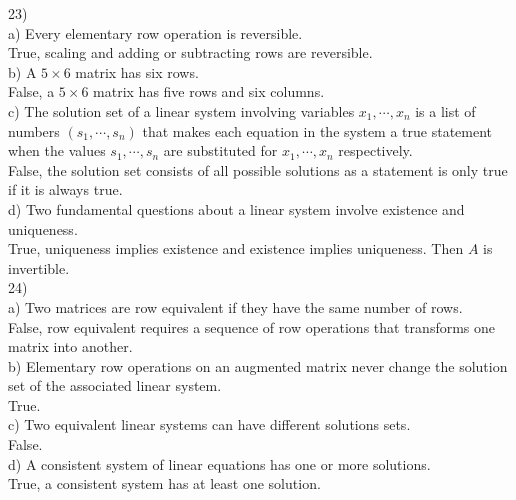\documentclass[]{article}
\begin{document}
23) \\

a) Every elementary row operation is reversible.\\
True, scaling and adding or subtracting rows are reversible.\\

b) A $5\times6$ matrix has six rows.\\
False, a $5\times6$ matrix has five rows and six columns.\\

c) The solution set of a linear system involving variables $x_1, \cdots, x_n$ is a list of numbers $(s_1,\cdots,s_n)$ that makes each equation in the system a true statement when the values $s_1,\cdots,s_n$ are substituted for $x_1,\cdots, x_n$ respectively.\\
False, the solution set consists of all possible solutions as a statement is only true if it is always true. \\

d) Two fundamental questions about a linear system involve existence and uniqueness.\\
True, uniqueness implies existence and existence implies uniqueness. Then $A$ is invertible.\\

24) \\

a) Two matrices are row equivalent if they have the same number of rows.\\
False, row equivalent requires a sequence of row operations that transforms one matrix into another.\\

b) Elementary row operations on an augmented matrix never change the solution set of the associated linear system.\\
True.\\

c) Two equivalent linear systems can have different solutions sets.\\
False.\\

d) A consistent system of linear equations has one or more solutions.\\
True, a consistent system has at least one solution.\\
\end{document}
